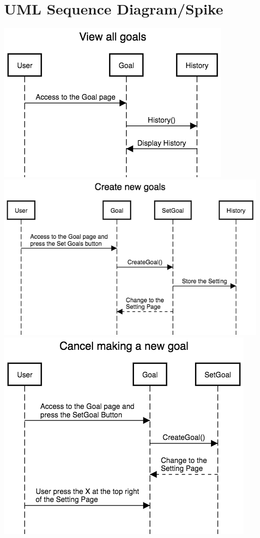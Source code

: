 \documentclass[a4paper]{article}
\begin{document}
\section{UML Sequence Diagram/Spike}
\includegraphics[width=\textwidth]{View_all_goals.png}
\newline
\newline
\newline
\includegraphics[width=\textwidth]{Create_new_goals.png}
\newline
\newline
\newline
\includegraphics[width=\textwidth]{Cancel_making_a_new_goal.png}
\end{document}
